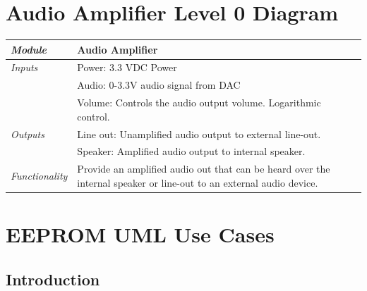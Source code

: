 \documentclass{article}
\begin{document}
\section{Audio Amplifier Level 0 Diagram}

\begin{tabular}{|p{1in}|p{5in}|}
\hline
\emph{Module} & Audio Amplifier \\
\hline
\emph{Inputs} & Power: 3.3 VDC Power\\
	      & Audio: 0-3.3V audio signal from DAC\\
	      & Volume: Controls the audio output volume. Logarithmic control.\\
\hline
\emph{Outputs}& Line out: Unamplified audio output to external line-out.\\ 
	      & Speaker: Amplified audio output to internal speaker.\\
\hline
\emph{Functionality}& Provide an amplified audio out that can be heard over the internal speaker or line-out to an external audio device.\\
\hline
\end{tabular}

\newpage

\section{EEPROM UML Use Cases}
\subsection{Introduction}
\end{document}
